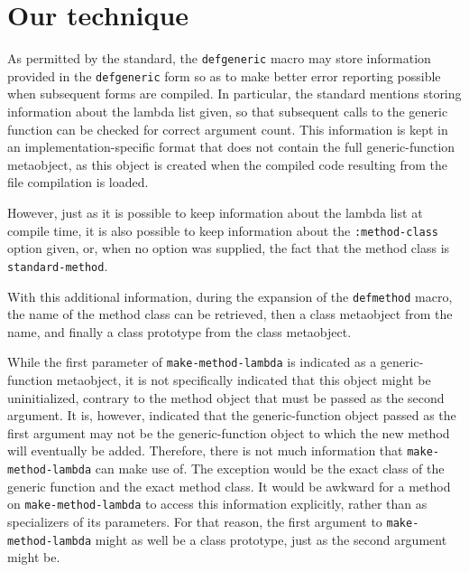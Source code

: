 \section{Our technique}

As permitted by the \commonlisp{} standard, the \texttt{defgeneric}
macro may store information provided in the \texttt{defgeneric} form
so as to make better error reporting possible when subsequent forms
are compiled.  In particular, the standard mentions storing
information about the lambda list given, so that subsequent calls to
the generic function can be checked for correct argument count.
This information is kept in an implementation-specific format that
does not contain the full generic-function metaobject, as this object
is created when the compiled code resulting from the file compilation
is loaded.

However, just as it is possible to keep information about the lambda
list at compile time, it is also possible to keep information about
the \texttt{:method-class} option given, or, when no option was
supplied, the fact that the method class is \texttt{standard-method}.

With this additional information, during the expansion of the
\texttt{defmethod} macro, the name of the method class can be
retrieved, then a class metaobject from the name, and finally a class
prototype from the class metaobject. 

While the first parameter of \texttt{make-method-lambda} is indicated
as a generic-function metaobject, it is not specifically indicated
that this object might be uninitialized, contrary to the method object
that must be passed as the second argument.  It is, however, indicated
that the generic-function object passed as the first argument may not
be the generic-function object to which the new method will eventually
be added.  Therefore, there is not much information that
\texttt{make-method-lambda} can make use of.  The exception would be
the exact class of the generic function and the exact method class.
It would be awkward for a method on \texttt{make-method-lambda} to
access this information explicitly, rather than as specializers of its
parameters.  For that reason, the first argument to
\texttt{make-method-lambda} might as well be a class prototype, just
as the second argument might be. 
